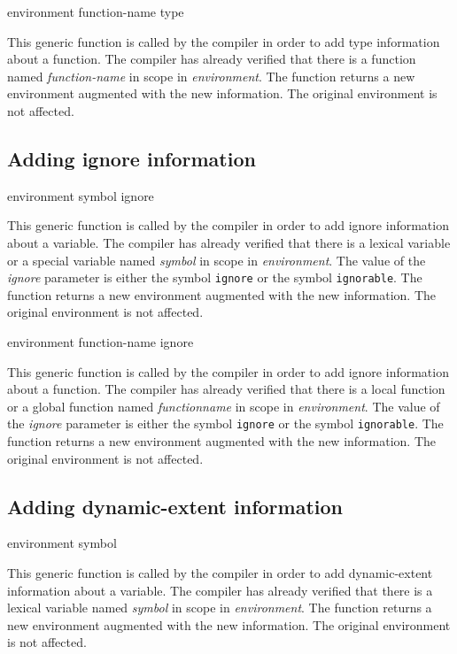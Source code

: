  {environment function-name type}

This generic function is called by the compiler in order to add type
information about a function.  The compiler has already verified that
there is a function named \textit{function-name} in scope in
\textit{environment}.  The function returns a new environment
augmented with the new information.  The original environment is not
affected.

\subsection{Adding ignore information}

 {environment symbol ignore}

This generic function is called by the compiler in order to add ignore
information about a variable.  The compiler has already verified that
there is a lexical variable or a special variable named
\textit{symbol} in scope in \textit{environment}.  The value of the
\textit{ignore} parameter is either the symbol \texttt{ignore} or the
symbol \texttt{ignorable}.  The function returns a new environment
augmented with the new information.  The original environment is not
affected.

 {environment function-name ignore}

This generic function is called by the compiler in order to add ignore
information about a function.  The compiler has already verified that
there is a local function or a global function named
\textit{functionname} in scope in \textit{environment}.  The value of
the \textit{ignore} parameter is either the symbol \texttt{ignore} or
the symbol \texttt{ignorable}.  The function returns a new environment
augmented with the new information.  The original environment is not
affected.

\subsection{Adding dynamic-extent information}

 {environment symbol}

This generic function is called by the compiler in order to add
dynamic-extent information about a variable.  The compiler has already
verified that there is a lexical variable named \textit{symbol} in
scope in \textit{environment}.  The function returns a new environment
augmented with the new information.  The original environment is not
affected.

